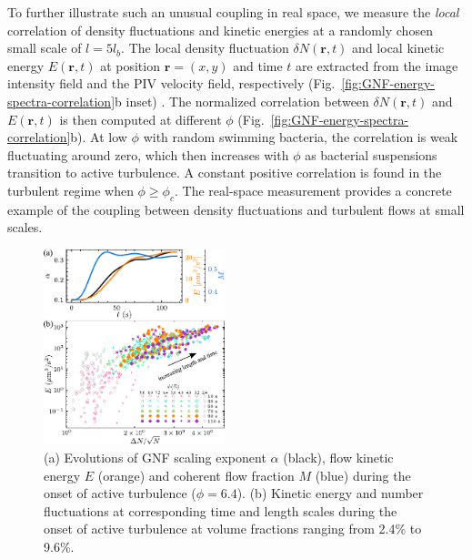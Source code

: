 \documentclass[twocolumn,aps,prl,amsmath,amssymb,longbibliography]{revtex4-2}
\begin{document}
To further illustrate such an unusual coupling in real space, we measure the \emph{local} correlation of density fluctuations and kinetic energies at a randomly chosen small scale of $l = 5l_b$. The local density fluctuation $\delta N(\mathbf{r},t)$ and local kinetic energy $E(\mathbf{r},t)$ at position $\mathbf{r} = (x,y)$ and time $t$ are extracted from the image intensity field and the PIV velocity field, respectively (Fig.~\ref{fig:GNF-energy-spectra-correlation}b inset) \cite{Liu2020}.
The normalized correlation between $\delta N(\mathbf{r},t)$ and $E(\mathbf{r},t)$ is then computed at different $\phi$ (Fig.~\ref{fig:GNF-energy-spectra-correlation}b). At low $\phi$ with random swimming bacteria, the correlation is weak fluctuating around zero, which then increases with $\phi$ as bacterial suspensions transition to active turbulence. A constant positive correlation is found in the turbulent regime when $\phi \geq \phi_c$. The real-space measurement provides a concrete example of the coupling between density fluctuations and turbulent flows at small scales.

\begin{figure}[!]
\begin{center}
\includegraphics[width=0.47\textwidth]{figures/GNF-energy-spectra-correlation-transient/v1.pdf}
\caption[The correlation between GNF and kinetic energy and kinetic energy spectra at transient state]
{
(a) Evolutions of GNF scaling exponent $\alpha$ (black), flow kinetic energy $E$ (orange) and coherent flow fraction $M$ (blue) during the onset of active turbulence ($\phi=6.4$).
(b) Kinetic energy and number fluctuations at corresponding time and length scales during the onset of active turbulence at volume fractions ranging from 2.4\% to 9.6\%.
}
\label{fig:GNF-energy-spectra-correlation-transient}
\end{center}
\end{figure}
\end{document}
